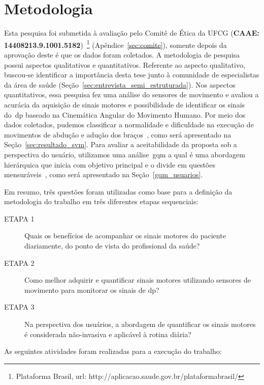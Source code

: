 \section{Metodologia}
Esta pesquisa foi submetida à avaliação pelo Comitê de Ética da UFCG (\textbf{CAAE: 14408213.9.1001.5182})~\footnote{Plataforma Brasil, url: http://aplicacao.saude.gov.br/plataformabrasil/} (Apêndice~\ref{sec:comite}), somente depois da aprovação deste é que os dados foram coletados. A metodologia de pesquisa possui aspectos qualitativos e quantitativos. Referente ao aspecto qualitativo, buscou-se identificar a importância desta tese junto à comunidade de especialistas da área de saúde (Seção~\ref{sec:entrevista_semi_estruturada}). Nos aspectos quantitativos, essa pesquisa fez uma análise do sensores de movimento e avaliou a acurácia da aquisição de sinais motores e possibilidade de identificar os sinais do~\ac{dp} baseado na Cinemática Angular do Movimento Humano. Por meio dos dados coletados, pudemos classificar a normalidade e dificuldade na execução de movimentos de abdução e adução dos braços~\cite{mcginnis2013biomechanics}, como será apresentado na Seção~\ref{sec:resultado_svm}. Para avaliar a aceitabilidade da proposta sob a perspectiva do usuário, utilizamos uma análise~\ac{gqm} a qual é uma abordagem hierárquica que inicia com objetivo principal e o divide em questões mensuráveis~\cite{saraiva2006}, como será apresentado na Seção~\ref{gqm_usuarios}.

Em resumo, três questões foram utilizadas como base para a definição da metodologia do trabalho em três diferentes etapas sequenciais:
	\begin{description}
	\item[ETAPA 1] Quais os benefícios de acompanhar os sinais motores do paciente diariamente, do ponto de vista do profissional da saúde?
	\item[ETAPA 2] Como melhor adquirir e quantificar sinais motores utilizando sensores de movimento para monitorar os sinais de \ac{dp}?
	\item[ETAPA 3] Na perspectiva dos usuários, a abordagem de quantificar os sinais motores é considerada não-invasiva e aplicável à rotina diária?
	\end{description}

As seguintes atividades foram realizadas para a execução do trabalho:

